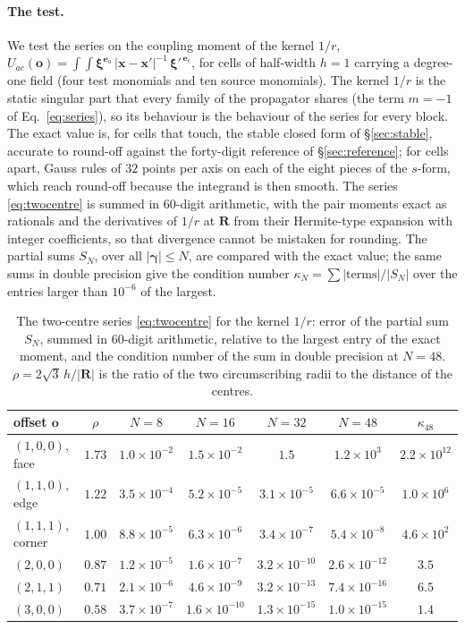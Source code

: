 \documentclass[11pt,a4paper]{article}
\newcommand{\bR}{\mathbf{R}}
\newcommand{\bo}{\mathbf{o}}
\newcommand{\bxi}{\boldsymbol{\xi}}
\begin{document}
\paragraph{The test.} We test the series on the coupling moment of the kernel $1/r$,
$U_{ac}(\bo)=\int\!\int\bxi^{\mathbf e_a}\,|\mathbf x-\mathbf x'|^{-1}\,\bxi'^{\,\mathbf e_c}$, for cells
of half-width $h=1$ carrying a degree-one field (four test monomials and ten source monomials). The kernel
$1/r$ is the static singular part that every family of the propagator shares (the term $m=-1$ of
Eq.~\eqref{eq:series}), so its behaviour is the behaviour of the series for every block. The exact value
is, for cells that touch, the stable closed form of \S\ref{sec:stable}, accurate to round-off against the
forty-digit reference of \S\ref{sec:reference}; for cells apart, Gauss rules of $32$ points per axis on
each of the eight pieces of the $s$-form, which reach round-off because the integrand is then smooth. The
series \eqref{eq:twocentre} is summed in $60$-digit arithmetic, with the pair moments exact as rationals
and the derivatives of $1/r$ at $\bR$ from their Hermite-type expansion with integer coefficients, so that
divergence cannot be mistaken for rounding. The partial sums $S_N$, over all $|\boldsymbol\gamma|\le N$,
are compared with the exact value; the same sums in double precision give the condition number
$\kappa_N=\sum|\text{terms}|/|S_N|$ over the entries larger than $10^{-6}$ of the largest.

\begin{table}[h]
\centering
\small
\begin{tabular}{lcccccc}
\toprule
offset $\bo$ & $\rho$ & $N=8$ & $N=16$ & $N=32$ & $N=48$ & $\kappa_{48}$ \\
\midrule
$(1,0,0)$, face   & $1.73$ & $1.0\times10^{-2}$ & $1.5\times10^{-2}$ & $1.5$ & $1.2\times10^{3}$ & $2.2\times10^{12}$ \\
$(1,1,0)$, edge   & $1.22$ & $3.5\times10^{-4}$ & $5.2\times10^{-5}$ & $3.1\times10^{-5}$ & $6.6\times10^{-5}$ & $1.0\times10^{6}$ \\
$(1,1,1)$, corner & $1.00$ & $8.8\times10^{-5}$ & $6.3\times10^{-6}$ & $3.4\times10^{-7}$ & $5.4\times10^{-8}$ & $4.6\times10^{2}$ \\
$(2,0,0)$         & $0.87$ & $1.2\times10^{-5}$ & $1.6\times10^{-7}$ & $3.2\times10^{-10}$ & $2.6\times10^{-12}$ & $3.5$ \\
$(2,1,1)$         & $0.71$ & $2.1\times10^{-6}$ & $4.6\times10^{-9}$ & $3.2\times10^{-13}$ & $7.4\times10^{-16}$ & $6.5$ \\
$(3,0,0)$         & $0.58$ & $3.7\times10^{-7}$ & $1.6\times10^{-10}$ & $1.3\times10^{-15}$ & $1.0\times10^{-15}$ & $1.4$ \\
\bottomrule
\end{tabular}
\caption{The two-centre series \eqref{eq:twocentre} for the kernel $1/r$: error of the partial sum $S_N$,
summed in $60$-digit arithmetic, relative to the largest entry of the exact moment, and the condition
number of the sum in double precision at $N=48$. $\rho=2\sqrt3\,h/|\bR|$ is the ratio of the two
circumscribing radii to the distance of the centres.}
\label{tab:twocentre}
\end{table}
\end{document}
